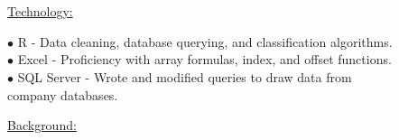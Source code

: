 \documentclass{res}
\begin{document}
\begin{resume}
%		
%
%


\\
\vspace{-5 pt}\\
\begin{minipage}{.5\textwidth} \normalsize{ \underline{ Technology:}    }
		
		\begin{minipage}{1\textwidth} 
			$\bullet$ R - Data cleaning, database querying, and classification algorithms.\\
			$\bullet$ Excel - Proficiency with array formulas, index, and offset functions.\\
			$\bullet$ SQL Server - Wrote and modified queries to draw data from\\ \hphantom{f}	\hspace{55 pt} company databases.
		\end{minipage}
\end{minipage}
\begin{minipage}{1.25\textwidth} 
\normalsize{\underline{ Background:}}


\end{minipage}
\end{resume}
\end{document}
